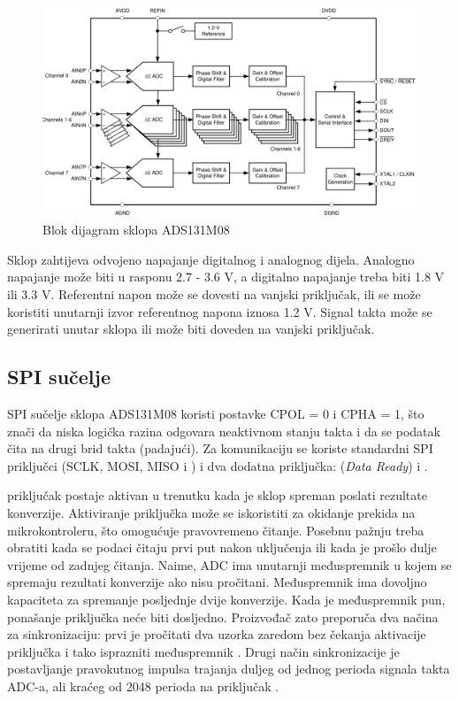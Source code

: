             \begin{figure}[htb]
                \centering
                \includegraphics[width=\textwidth]{slike/ads131m08_blok_dijagram.png}
                \caption{Blok dijagram sklopa ADS131M08 \cite{ads131m08_datasheet}}
                \label{fig:ads131m08_blok_dijagram}
            \end{figure}

            Sklop zahtijeva odvojeno napajanje digitalnog i analognog dijela. Analogno napajanje može biti u rasponu 2.7 - 3.6 V, a digitalno napajanje treba biti 1.8 V ili 3.3 V. Referentni napon može se dovesti na vanjski priključak, ili se može koristiti unutarnji izvor referentnog napona iznosa 1.2 V. Signal takta može se generirati unutar sklopa ili može biti doveden na vanjski priključak. 

        \subsection{SPI sučelje}
            SPI sučelje sklopa ADS131M08 koristi postavke CPOL = 0 i CPHA = 1, što znači da niska logička razina odgovara neaktivnom stanju takta i da se podatak čita na drugi brid takta (padajući). Za komunikaciju se koriste standardni SPI priključci (SCLK, MOSI, MISO i ) i dva dodatna priključka:  (\textit{Data Ready}) i .
            
             priključak postaje aktivan u trenutku kada je sklop spreman poslati rezultate konverzije. Aktiviranje priključka može se iskoristiti za okidanje prekida na mikrokontroleru, što omogućuje pravovremeno čitanje. Posebnu pažnju treba obratiti kada se podaci čitaju prvi put nakon uključenja ili kada je prošlo dulje vrijeme od zadnjeg čitanja. Naime, ADC ima unutarnji međuspremnik u kojem se spremaju rezultati konverzije ako nisu pročitani. Međuspremnik ima dovoljno kapaciteta za spremanje posljednje dvije konverzije. Kada je međuspremnik pun, ponašanje priključka  neće biti dosljedno. Proizvođač zato preporuča dva načina za sinkronizaciju: prvi je pročitati dva uzorka zaredom bez čekanja aktivacije  priključka i tako isprazniti međuspremnik \cite[str.~40]{ads131m08_datasheet}. Drugi način sinkronizacije je postavljanje pravokutnog impulsa trajanja duljeg od jednog perioda signala takta ADC-a, ali kraćeg od 2048 perioda na priključak  \cite[str.~40, 46]{ads131m08_datasheet}.

